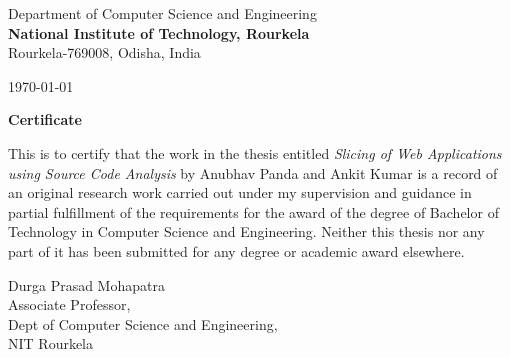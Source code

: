 \documentclass[11pt]{article}   %
\begin{document}
\hspace{10pt}
\begin{minipage}[t]{.8\textwidth}
\vspace{30pt}
\break
 Department of Computer Science and Engineering\\
\textbf{National Institute of Technology, Rourkela}\\
Rourkela-769008, Odisha, India
\begin{flushright}
\today\\
\end{flushright}

\end{minipage}

\vspace{1cm}
\begin{center}
\begin{Large}
\textbf{Certificate}
\end{Large}
\end{center}

This is to certify that the work in the thesis entitled \emph{ Slicing of Web Applications using Source Code Analysis} by Anubhav Panda and Ankit Kumar is a record of an original research work carried out under my supervision and guidance in partial fulfillment of the requirements for the award of the degree of Bachelor of
Technology in Computer Science and Engineering. Neither this thesis nor any part of it has been submitted for any degree or academic award elsewhere.

\vspace{2cm}

\begin{flushleft}
Durga Prasad Mohapatra\\
Associate Professor,\\
Dept of Computer Science and Engineering,\\
NIT Rourkela
\end{flushleft}
\end{document}
